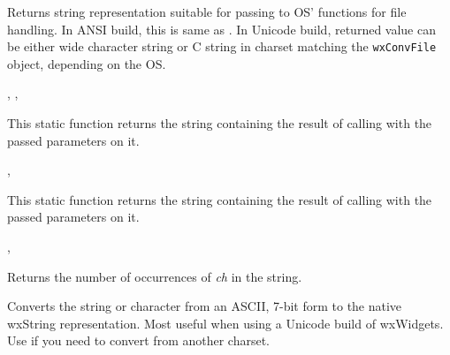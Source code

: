 


Returns string representation suitable for passing to OS' functions for
file handling. In ANSI build, this is same as .
In Unicode build, returned value can be either wide character string
or C string in charset matching the {\tt wxConvFile} object, depending on
the OS.


,
, 

\label{wxstringformat}


This static function returns the string containing the result of calling 
 with the passed parameters on it.


, 

\label{wxstringformatv}


This static function returns the string containing the result of calling 
 with the passed parameters on it.


, 

\label{wxstringfreq}


Returns the number of occurrences of {\it ch} in the string.

\label{wxstringfromascii}



Converts the string or character from an ASCII, 7-bit form
to the native wxString representation. Most useful when using
a Unicode build of wxWidgets.
Use  if you
need to convert from another charset.

